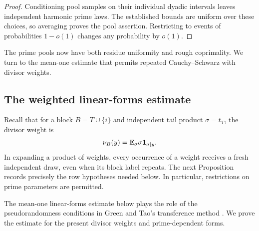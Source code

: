 \begin{proof}
Conditioning pool samples on their individual dyadic intervals leaves
independent harmonic prime laws.  The established bounds are uniform
over these choices, so averaging proves the pool assertion.
Restricting to events of probabilities \(1-o(1)\) changes any
probability by \(o(1)\).
\end{proof}

The prime pools now have both residue uniformity and rough coprimality.
We turn to the mean-one estimate that permits repeated
Cauchy--Schwarz with divisor weights.

\subsection{The weighted linear-forms estimate}

Recall that for a block \(B=T\cup\{i\}\) and independent tail
product \(\sigma=t_T\), the divisor weight is
\begin{equation}\label{eq:arithmetic-divisor-weight}
 \nu_B(y)=\mathbb E_{\sigma}\sigma\mathbf 1_{\sigma\mid y}.
\end{equation}
In expanding a product of weights, every occurrence of a weight
receives a fresh independent draw, even when its block label repeats.
The next Proposition records precisely the row hypotheses needed
below.  In particular, restrictions on prime parameters are permitted.

The mean-one linear-forms estimate below plays the role of the
pseudorandomness conditions in Green and Tao's transference method
\cite[Definition~3.1 and Section~5]{GreenTaoPrimes}.
We prove the estimate for the present divisor weights and
prime-dependent forms.

